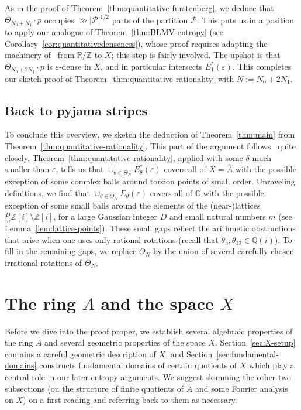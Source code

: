 \documentclass[11pt]{amsart}
\theoremstyle{definition}
\begin{document}
As in the proof of Theorem~\ref{thm:quantitative-furstenberg}, we deduce that $\Theta_{N_0+N_1} \cdot p$ occupies $\gg |\mathcal{P}|^{1/2}$ parts of the partition $\mathcal{P}$.  This puts us in a position to apply our analogue of Theorem~\ref{thm:BLMV-entropy} (see Corollary~\ref{cor:quantitativedenseness}), whose proof requires adapting the machinery of~\cite{BLMV08} from $\mathbb{R}/\mathbb{Z}$ to $X$; this step is fairly involved.  The upshot is that $\Theta_{N_0+2N_1} \cdot p$ is $\varepsilon$-dense in $X$, and in particular intersects $E^*_1(\varepsilon)$.  This completes our sketch proof of Theorem~\ref{thm:quantitative-rationality} with $N:=N_0+2N_1$. 

\subsection{Back to pyjama stripes}
To conclude this overview, we sketch the deduction of Theorem~\ref{thm:main} from Theorem~\ref{thm:quantitative-rationality}.  This part of the argument follows~\cite{Man13} quite closely.  Theorem~\ref{thm:quantitative-rationality}, applied with some $\delta$ much smaller than $\varepsilon$, tells us that $\cup_{\theta \in \Theta_N} E^*_{\theta}(\varepsilon)$ covers all of $X=\widehat{A}$ with the possible exception of some complex balls around torsion points of small order.  Unraveling definitions, we find that $\cup_{\theta \in \Theta_N} E_{\theta}(\varepsilon)$ covers all of $\mathbb{C}$ with the possible exception of some small balls around the elements of the (near-)lattices $\frac{D}{m}\mathbb{Z}[i] \setminus \mathbb{Z}[i]$, for a large Gaussian integer $D$ and small natural numbers $m$ (see Lemma~\ref{lem:lattice-points}).  These small gaps reflect the arithmetic obstructions that arise when one uses only rational rotations (recall that $\theta_5,\theta_{13} \in \mathbb{Q}(i)$).  To fill in the remaining gaps, we replace $\Theta_N$ by the union of several carefully-chosen irrational rotations of $\Theta_N$.






\section{The ring $A$ and the space $X$}\label{s:notation}

Before we dive into the proof proper, we establish several algebraic properties of the ring $A$ and several geometric properties of the space $X$.  Section~\ref{sec:X-setup} contains a careful geometric description of $X$, and Section~\ref{sec:fundamental-domains} constructs fundamental domains of certain quotients of $X$ which play a central role in our later entropy arguments.  We suggest skimming the other two subsections (on the structure of finite quotients of $A$ and some Fourier analysis on $X$) on a first reading and referring back to them as necessary.
\end{document}
